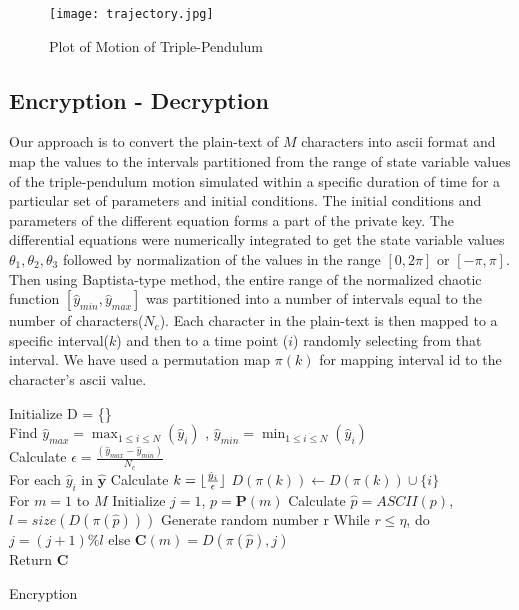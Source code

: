 \begin{figure}[H]
\centering
\texttt{[image: trajectory.jpg]}
\caption{Plot of Motion of Triple-Pendulum}\label{fig:trajectory}
\end{figure}


\subsection{Encryption - Decryption}
Our approach is to convert the plain-text of $M$ characters into ascii format and  map the values to the intervals partitioned from the range of state variable values of the triple-pendulum motion simulated within a specific duration of time for a particular set of parameters and initial conditions. The initial conditions and parameters of the different equation forms a part of the private key. The differential equations were numerically integrated to get the state variable values $\theta_{1},\theta_{2},\theta_{3}$ followed by normalization of the values in the range $[0,2\pi]$ or $[-\pi,\pi]$. Then using Baptista-type method, the entire range of the normalized chaotic function $[\hat{y}_{min},\hat{y}_{max}]$ was partitioned into a number of intervals equal to the number of characters($N_{c}$). Each character in the plain-text is then mapped to a specific interval($k$) and then to a time point ($i$) randomly selecting from that interval. We have used a permutation map $\pi(k)$ for mapping interval id to the character's ascii value.

\begin{algorithm}
Initialize D = \{\}\\
Find $\hat{y}_{max} = \max_{1 \leq i \leq N}(\hat{y}_{i})$ , $\hat{y}_{min}=\min_{1 \leq i \leq N}(\hat{y}_{i})$\\
Calculate $\epsilon = \frac{(\hat{y}_{max} - \hat{y}_{min})}{N_{c}}$\\
For each $\hat{y}_{i}$ in $\hat{\textbf{y}}$ \linebreak
 Calculate $k = \lfloor\frac{\hat{y}_{i}}{\epsilon}\rfloor$\linebreak
 $D(\pi(k)) \leftarrow D(\pi(k)) \cup \{i\}$\\
For $m = 1$ to $M$\linebreak
 Initialize $j = 1$, $p = \textbf{P}(m)$ \linebreak
 Calculate $\hat{p} = ASCII(p)$, $l = size(D(\pi(\hat{p})))$ \linebreak
 Generate random number r \linebreak
 While $r \leq \eta $, do $j=(j+1) \% l$ else  $ \textbf{C}(m) = D(\pi(\hat{p}), j)$\\
Return \textbf{C}
\caption{Encryption}
\label{algo:encrypt}
\end{algorithm}

